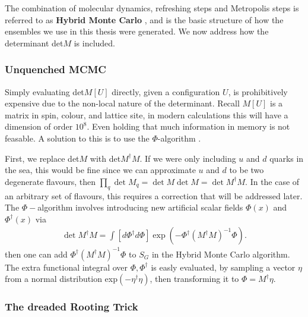 The combination of molecular dynamics, refreshing steps and Metropolis steps is referred to as {\bf{Hybrid Monte Carlo}} \cite{DUANE1987216}, and is the basic structure of how the ensembles we use in this thesis were generated. We now address how the determinant det$M$ is included.

\subsubsection{Unquenched MCMC}

Simply evaluating det$M[U]$ directly, given a configuration $U$, is prohibitively expensive due to the non-local nature of the determinant. Recall $M[U]$ is a matrix in spin, colour, and lattice site, in modern calculations this will have a dimension of order $10^8$. Even holding that much information in memory is not feasable. A solution to this is to use the $\Phi$-algorithm \cite{PhysRevD.35.2531}.

First, we replace det$M$ with det$M^{\dagger}M$. If we were only including $u$ and $d$ quarks in the sea, this would be fine since we can approximate $u$ and $d$ to be two degenerate flavours, then $\prod_q \det M_q = \det M \det M = \det M^{\dagger} M$. In the case of an arbitrary set of flavours, this requires a correction that will be addressed later.
The $\Phi-$algorithm involves introducing new artificial scalar fields $\Phi(x)$ and $\Phi^{\dagger}(x)$ via
\begin{align}
  \det M^{\dagger} M = \int [d\Phi^{\dagger}d\Phi] \exp(-\Phi^{\dagger} (M^{\dagger}M)^{-1}\Phi).
\end{align}
then one can add $\Phi^{\dagger} (M^{\dagger}M)^{-1}\Phi$ to $S_G$ in the Hybrid Monte Carlo algorithm. The extra functional integral over $\Phi,\Phi^{\dagger}$ is easly evaluated, by sampling a vector $\eta$ from a normal distribution exp$(-\eta^{\dagger}\eta)$, then transforming it to $\Phi = M^{\dagger} \eta$.

\subsubsection{The dreaded Rooting Trick}

